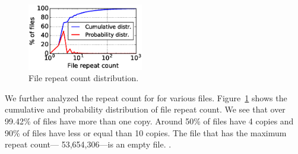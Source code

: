 %


\begin{figure} \centering
	\includegraphics[width=0.45\textwidth]{graphs/File_repeat_count.eps}
	\caption{File repeat count distribution.  } \label{fig:file-repeat-cnt}
\end{figure}

We further analyzed the repeat count for for various files.
%
Figure~\ref{fig:file-repeat-cnt} shows the cumulative and probability
distribution of file repeat count.  
%
We see that over 99.42\% of files have more than one copy.
%
Around 50\% of files have 4 copies and 90\% of files have less or equal than 10
copies. 
%
The file that has the maximum repeat count--- 53,654,306---is an empty file.
%
.
